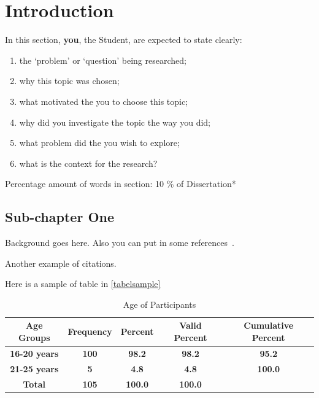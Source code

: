 
\chapter{Introduction}
\begin{spacing}{2.0}

In this section, \textbf{you}, the Student, are expected to state clearly:
\begin{enumerate}[label=(\alph*)]
    \item the `problem’ or `question’ being researched;
    \item why this topic was chosen;
    \item what motivated the you to choose this topic;
    \item why did you investigate the topic the way you did;
    \item what problem did the you wish to explore;
    \item what is the context for the research?
\end{enumerate}
Percentage amount of words in section: 10 \% of Dissertation*

\section{Sub-chapter One}


Background goes here. Also you can put in some references~.

Another example of citations.

Here is a sample of table in \autoref{tabelsample}


\begin{table}[ht]
\centering
{}
{\def\arraystretch{1.5}
    \begin{tabular}{|c|c|c|c|c|} 
    \hline
    
    \textbf{Age Groups}  & \textbf{Frequency} & \textbf{Percent} & \textbf{Valid Percent} & \textbf{Cumulative Percent}  \\[5pt]
    
    \hline 
    \textbf{16-20 years} & \textbf{100}       & \textbf{98.2}    & \textbf{98.2}          & \textbf{95.2}                \\ 
    \hline
    \textbf{21-25 years} & \textbf{5}         & \textbf{4.8}     & \textbf{4.8}           & \textbf{100.0}               \\ 
    \hline
    \textbf{Total}       & \textbf{105}       & \textbf{100.0}   & \textbf{100.0}         &                              \\
    \hline
    \end{tabular}
}
\caption{Age of Participants}
\label{tabelsample}
\end{table}




\end{spacing}

